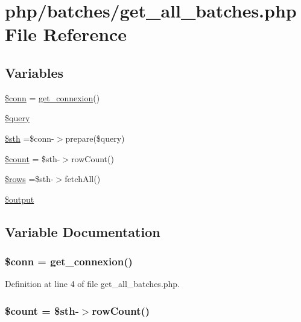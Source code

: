\hypertarget{get__all__batches_8php}{\section{php/batches/get\-\_\-all\-\_\-batches.php File Reference}
\label{get__all__batches_8php}
}
\subsection*{Variables}
\begin{DoxyCompactItemize}
\item 
\hyperlink{get__all__batches_8php_aa8a5a87b9c1a6a0819b88447cbe41877}{\$conn} = \hyperlink{php__functions_8php_ace18bc10f3fd08f92688ac743e0d8c2e}{get\-\_\-connexion}()
\item 
\hyperlink{get__all__batches_8php_af59a5f7cd609e592c41dc3643efd3c98}{\$query}
\item 
\hyperlink{get__all__batches_8php_afa9126f9664959c02795be300a135f93}{\$sth} =\$conn-\/$>$prepare(\$query)
\item 
\hyperlink{get__all__batches_8php_af789423037bbc89dc7c850e761177570}{\$count} = \$sth-\/$>$row\-Count()
\item 
\hyperlink{get__all__batches_8php_ace2ec39e7df3899fa8df9640ec274b03}{\$rows} =\$sth-\/$>$fetch\-All()
\item 
\hyperlink{get__all__batches_8php_a73004ce9cd673c1bfafd1dc351134797}{\$output}
\end{DoxyCompactItemize}


\subsection{Variable Documentation}
\hypertarget{get__all__batches_8php_aa8a5a87b9c1a6a0819b88447cbe41877}{
\subsubsection[{\$conn}]{\setlength{\rightskip}{0pt plus 5cm}\$conn = {\bf get\-\_\-connexion}()}}\label{get__all__batches_8php_aa8a5a87b9c1a6a0819b88447cbe41877}


Definition at line 4 of file get\-\_\-all\-\_\-batches.\-php.

\hypertarget{get__all__batches_8php_af789423037bbc89dc7c850e761177570}{
\subsubsection[{\$count}]{\setlength{\rightskip}{0pt plus 5cm}\$count = \$sth-\/$>$row\-Count()}}\label{get__all__batches_8php_af789423037bbc89dc7c850e761177570}


